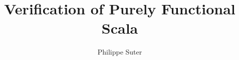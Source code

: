 \documentclass{article}
\title{Verification of Purely Functional Scala}
\author{Philippe Suter}
\begin{document}
\maketitle













\nocite{*}

\clearpage


\end{document}

